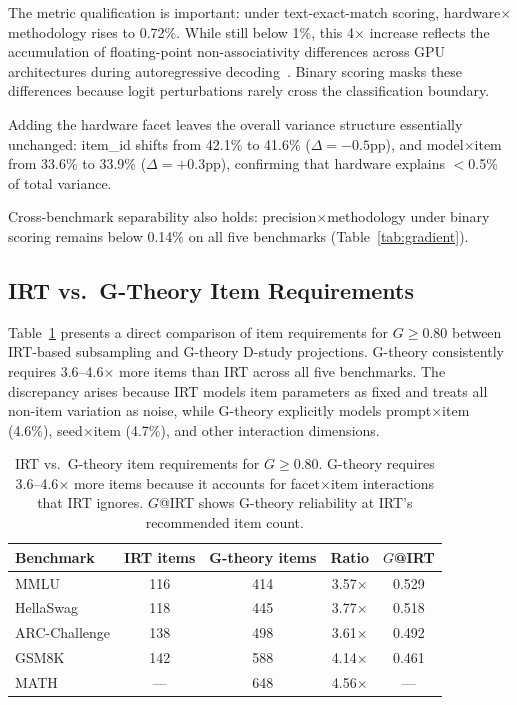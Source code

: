 \documentclass[11pt,a4paper]{article}
\newcommand{\Gcoeff}{\ensuremath{G}}
\begin{document}
The metric qualification is important: under text-exact-match scoring, hardware$\times$methodology rises to 0.72\%.
While still below 1\%, this 4$\times$ increase reflects the accumulation of floating-point non-associativity differences across GPU architectures during autoregressive decoding~\citep{messina2026}.
Binary scoring masks these differences because logit perturbations rarely cross the classification boundary.

Adding the hardware facet leaves the overall variance structure essentially unchanged: item\_id shifts from 42.1\% to 41.6\% ($\Delta=-0.5$pp), and model$\times$item from 33.6\% to 33.9\% ($\Delta=+0.3$pp), confirming that hardware explains $<$0.5\% of total variance.

Cross-benchmark separability also holds: precision$\times$methodology under binary scoring remains below 0.14\% on all five benchmarks (Table~\ref{tab:gradient}).

\subsection{IRT vs.\ G-Theory Item Requirements}
\label{sec:irt}

Table~\ref{tab:irt} presents a direct comparison of item requirements for $\Gcoeff\geq0.80$ between IRT-based subsampling and G-theory D-study projections.
G-theory consistently requires 3.6--4.6$\times$ more items than IRT across all five benchmarks.
The discrepancy arises because IRT models item parameters as fixed and treats all non-item variation as noise, while G-theory explicitly models prompt$\times$item (4.6\%), seed$\times$item (4.7\%), and other interaction dimensions.

\begin{table}[t]
\centering
\caption{IRT vs.\ G-theory item requirements for $\Gcoeff\geq0.80$. G-theory requires 3.6--4.6$\times$ more items because it accounts for facet$\times$item interactions that IRT ignores. $\Gcoeff$@IRT shows G-theory reliability at IRT's recommended item count.}
\label{tab:irt}
\small
\begin{tabular}{lcccc}
\toprule
\textbf{Benchmark} & \textbf{IRT items} & \textbf{G-theory items} & \textbf{Ratio} & \textbf{$\Gcoeff$@IRT} \\
\midrule
MMLU           & 116 & 414 & 3.57$\times$ & 0.529 \\
HellaSwag      & 118 & 445 & 3.77$\times$ & 0.518 \\
ARC-Challenge  & 138 & 498 & 3.61$\times$ & 0.492 \\
GSM8K          & 142 & 588 & 4.14$\times$ & 0.461 \\
MATH           & ---  & 648 & 4.56$\times$ & --- \\
\bottomrule
\end{tabular}
\end{table}
\end{document}
